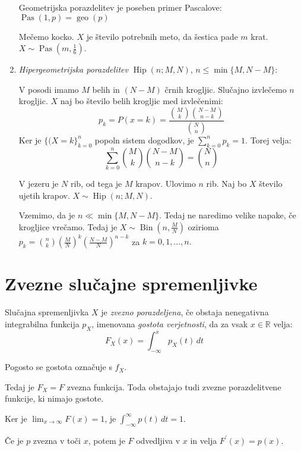 \documentclass[12pt]{book}
\def\n{\noindent}
\def\s{\vspace{10pt}}
\theoremstyle{definition}
\theoremstyle{plain}
\theoremstyle{plain}
\theoremstyle{plain}
\theoremstyle{remark}
\begin{document}
\begin{enumerate}
    Geometrijska porazdelitev je poseben primer Pascalove: $\operatorname{Pas}(1,p) = \operatorname{geo}(p)$

    \begin{zgled}
        Mečemo kocko. $X$ je število potrebnih meto, da šestica pade $m$ krat. $X \sim \operatorname{Pas}(m, \frac{1}{6})$.
    \end{zgled}

    \item \emph{Hipergeometrijska porazdelitev} $\operatorname{Hip}(n; M, N)$, $n \leq \min \{M, N-M\}$:
    
    V posodi imamo $M$ belih in $(N-M)$ črnih krogljic. Slučajno izvlečemo $n$ krogljic. $X$ naj bo število belih krogljic med izvlečenimi:
    $$
    p_k=P(x=k)=\frac{\binom{M}{k} \binom{N-M}{n-k}}{\binom{N}{n}}
    $$
    Ker je $\{(X=k\}_{k=0}^n$ popoln sistem dogodkov, je $\sum_{k=0}^n p_k=1$. Torej velja:
    $$
    \sum_{k=0}^{n} \binom{M}{k} \binom{N-M}{n-k} = \binom{N}{n}
    $$
    \begin{zgled}
        V jezeru je $N$ rib, od tega je $M$ krapov. Ulovimo $n$ rib. Naj bo $X$ število ujetih krapov. $X \sim \operatorname{Hip}(n;M,N)$.
    \end{zgled}

    Vzemimo, da je $n \ll \min\{M, N-M\}$. Tedaj ne naredimo velike napake, če krogljice vrečamo. Tedaj je $X \sim \operatorname{Bin}(n, \frac{M}{N})$ ozirioma $p_k = \binom{n}{k} \left(\frac{M}{N}\right)^k \left(\frac{N-M}{N}\right)^{n-k}$ za $k=0, 1, \ldots , n.$

\end{enumerate}

\section{Zvezne slučajne spremenljivke}

Slučajna spremenljivka $X$ je \emph{zvezno porazdeljena}, če obstaja nenegativna integrabilna funkcija $p_X$, imenovana \emph{gostota verjetnosti}, da za vsak $x \in \mathbb{R}$ velja:
$$
F_X(x)=\int_{-\infty}^x p_X(t) \, d t
$$

Pogosto se gostota označuje s $f_X$. 

\n Tedaj je $F_X=F$ zvezna funkcija. Toda obstajajo tudi zvezne porazdelitvene funkcije, ki nimajo gostote. \s

\n Ker je $\lim _{x \rightarrow \infty} F(x)=1$, je $\int_{-\infty}^{\infty} p(t) \, d t=1$. \s

\n Če je $p$ zvezna v toči $x$, potem je $F$ odvedljiva v $x$ in velja $F^{\prime}(x)=p(x)$. \s
\end{document}
